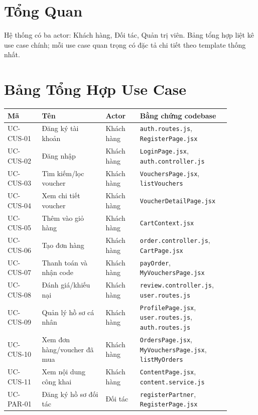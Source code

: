 \section{Tổng Quan}
Hệ thống có ba actor: Khách hàng, Đối tác, Quản trị viên. Bảng tổng hợp liệt kê use case chính; mỗi use case quan trọng có đặc tả chi tiết theo template thống nhất.

\section{Bảng Tổng Hợp Use Case}
\small
\begin{longtable}{>{\raggedright\arraybackslash}p{0.14\linewidth}>{\raggedright\arraybackslash}p{0.26\linewidth}>{\raggedright\arraybackslash}p{0.14\linewidth}>{\raggedright\arraybackslash}p{0.34\linewidth}}
\toprule
\textbf{Mã} & \textbf{Tên} & \textbf{Actor} & \textbf{Bằng chứng codebase}\\
\midrule
\endhead
UC-CUS-01 & Đăng ký tài khoản & Khách hàng & \texttt{auth.routes.js}, \texttt{RegisterPage.jsx}\\
UC-CUS-02 & Đăng nhập & Khách hàng & \texttt{LoginPage.jsx}, \texttt{auth.controller.js}\\
UC-CUS-03 & Tìm kiếm/lọc voucher & Khách hàng & \texttt{VouchersPage.jsx}, \texttt{listVouchers}\\
UC-CUS-04 & Xem chi tiết voucher & Khách hàng & \texttt{VoucherDetailPage.jsx}\\
UC-CUS-05 & Thêm vào giỏ hàng & Khách hàng & \texttt{CartContext.jsx}\\
UC-CUS-06 & Tạo đơn hàng & Khách hàng & \texttt{order.controller.js}, \texttt{CartPage.jsx}\\
UC-CUS-07 & Thanh toán và nhận code & Khách hàng & \texttt{payOrder}, \texttt{MyVouchersPage.jsx}\\
UC-CUS-08 & Đánh giá/khiếu nại & Khách hàng & \texttt{review.controller.js}, \texttt{user.routes.js}\\
UC-CUS-09 & Quản lý hồ sơ cá nhân & Khách hàng & \texttt{ProfilePage.jsx}, \texttt{user.routes.js}, \texttt{auth.routes.js}\\
UC-CUS-10 & Xem đơn hàng/voucher đã mua & Khách hàng & \texttt{OrdersPage.jsx}, \texttt{MyVouchersPage.jsx}, \texttt{listMyOrders}\\
UC-CUS-11 & Xem nội dung công khai & Khách hàng & \texttt{ContentPage.jsx}, \texttt{content.service.js}\\
UC-PAR-01 & Đăng ký hồ sơ đối tác & Đối tác & \texttt{registerPartner}, \texttt{RegisterPage.jsx}\\

\end{longtable}
